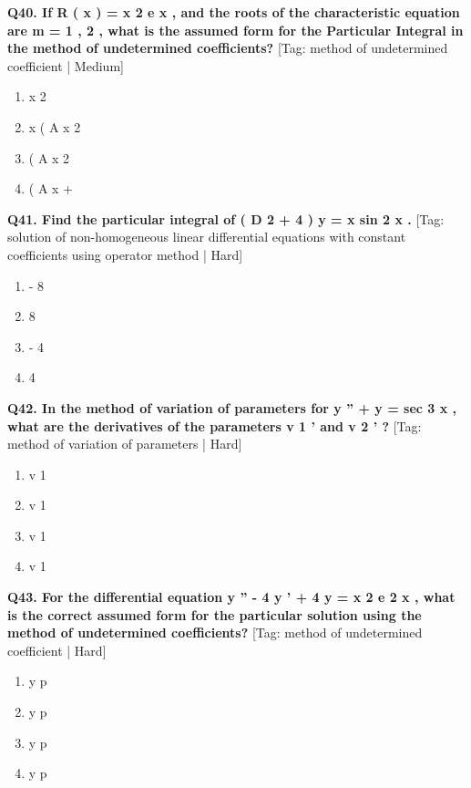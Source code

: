 \noindent\textbf{Q40. If R ( x ) = x 2 e x , and the roots of the characteristic equation are m = 1 , 2 , what is the assumed form for the Particular Integral in the method of undetermined coefficients?} \hfill [Tag: method of undetermined coefficient | Medium]
\begin{enumerate}[label=(\alph*),topsep=2pt,itemsep=1pt,partopsep=0pt,parsep=0pt]
    \item {{x 2}}
    \item {{x ( A x 2}}
    \item {{( A x 2}}
    \item {{( A x +}}
\end{enumerate}
\vspace{2mm}

\noindent\textbf{Q41. Find the particular integral of ( D 2 + 4 ) y = x sin 2 x .} \hfill [Tag: solution of non-homogeneous linear differential equations with constant coefficients using operator method | Hard]
\begin{enumerate}[label=(\alph*),topsep=2pt,itemsep=1pt,partopsep=0pt,parsep=0pt]
    \item {{- 8}}
    \item {{8}}
    \item {{- 4}}
    \item {{4}}
\end{enumerate}
\vspace{2mm}

\noindent\textbf{Q42. In the method of variation of parameters for y '' + y = sec 3 x , what are the derivatives of the parameters v 1 ' and v 2 ' ?} \hfill [Tag: method of variation of parameters | Hard]
\begin{enumerate}[label=(\alph*),topsep=2pt,itemsep=1pt,partopsep=0pt,parsep=0pt]
    \item {{v 1}}
    \item {{v 1}}
    \item {{v 1}}
    \item {{v 1}}
\end{enumerate}
\vspace{2mm}

\noindent\textbf{Q43. For the differential equation y '' - 4 y ' + 4 y = x 2 e 2 x , what is the correct assumed form for the particular solution using the method of undetermined coefficients?} \hfill [Tag: method of undetermined coefficient | Hard]
\begin{enumerate}[label=(\alph*),topsep=2pt,itemsep=1pt,partopsep=0pt,parsep=0pt]
    \item {{y p}}
    \item {{y p}}
    \item {{y p}}
    \item {{y p}}
\end{enumerate}
\vspace{2mm}

